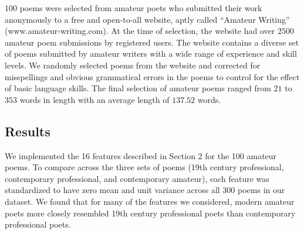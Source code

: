 \documentclass{book}
\begin{document}
$100$ poems were selected from amateur poets who submitted their work anonymously to a free and open-to-all website, aptly called ``Amateur Writing'' (www.amateur-writing.com). At the time of selection, the website had over $2500$ amateur poem submissions by registered users. The website contains a diverse set of poems submitted by amateur writers with a wide range of experience and skill levels. We randomly selected poems from the website and corrected for misspellings and obvious grammatical errors in the poems to control for the effect of basic language skills. The final selection of amateur poems ranged from $21$ to $353$ words in length with an average length of $137.52$ words. 


\subsection{Results}
We implemented the 16 features described in Section 2 for the 100 amateur poems. To compare across the three sets of poems (19th century professional, contemporary professional, and contemporary amateur), each feature was standardized to have zero mean and unit variance across all 300 poems in our dataset. We found that for many of the features we considered, modern amateur poets more closely resembled 19th century professional poets than contemporary professional poets. 
\end{document}
